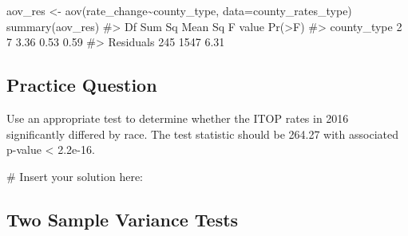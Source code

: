 \documentclass[
  letterpaper,
]{krantz}
\makeatletter
\newenvironment{Shaded}{\begin{snugshade}}{\end{snugshade}}
\newcommand{\AttributeTok}[1]{\textcolor[rgb]{0.40,0.45,0.13}{#1}}
\newcommand{\CommentTok}[1]{\textcolor[rgb]{0.37,0.37,0.37}{#1}}
\newcommand{\FunctionTok}[1]{\textcolor[rgb]{0.28,0.35,0.67}{#1}}
\newcommand{\NormalTok}[1]{\textcolor[rgb]{0.00,0.23,0.31}{#1}}
\newcommand{\OtherTok}[1]{\textcolor[rgb]{0.00,0.23,0.31}{#1}}
\newcommand{\SpecialCharTok}[1]{\textcolor[rgb]{0.37,0.37,0.37}{#1}}
\newenvironment{kframe}{%
\medskip{}
\setlength{\fboxsep}{.8em}
 \def\at@end@of@kframe{}%
 \ifinner\ifhmode%
  \def\at@end@of@kframe{\end{minipage}}%
  \begin{minipage}{\columnwidth}%
 \fi\fi%
 \def\FrameCommand##1{\hskip\@totalleftmargin \hskip-\fboxsep
 \colorbox{shadecolor}{##1}\hskip-\fboxsep
     \hskip-\linewidth \hskip-\@totalleftmargin \hskip\columnwidth}%
 \MakeFramed {\advance\hsize-\width
   \@totalleftmargin\z@ \linewidth\hsize
   \@setminipage}}%
 {\par\unskip\endMakeFramed%
 \at@end@of@kframe}
\renewenvironment{Shaded}{\begin{kframe}}{\end{kframe}}
\makeatother
\begin{document}
\begin{Shaded}
\end{Shaded}

\begin{Shaded}
\begin{Highlighting}[]
\NormalTok{aov\_res }\OtherTok{\textless{}{-}} \FunctionTok{aov}\NormalTok{(rate\_change}\SpecialCharTok{\textasciitilde{}}\NormalTok{county\_type, }\AttributeTok{data=}\NormalTok{county\_rates\_type)}
\FunctionTok{summary}\NormalTok{(aov\_res)}
\CommentTok{\#\textgreater{}              Df Sum Sq Mean Sq F value Pr(\textgreater{}F)}
\CommentTok{\#\textgreater{} county\_type   2      7    3.36    0.53   0.59}
\CommentTok{\#\textgreater{} Residuals   245   1547    6.31}
\end{Highlighting}
\end{Shaded}

\subsection{Practice Question}\label{practice-question-18}

Use an appropriate test to determine whether the ITOP rates in 2016
significantly differed by race. The test statistic should be 264.27 with
associated p-value \textless{} 2.2e-16.

\begin{Shaded}
\begin{Highlighting}[]
\CommentTok{\# Insert your solution here:}
\end{Highlighting}
\end{Shaded}

\subsection{Two Sample Variance Tests}\label{two-sample-variance-tests}
\end{document}
